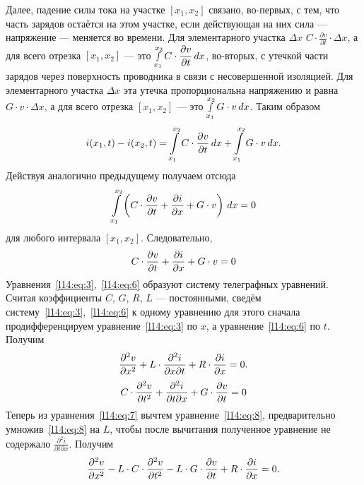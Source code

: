 \documentclass[12pt,a4paper,openany,fleqn]{book}
\newcommand{\pder}[2]{\ensuremath{\frac{\partial#1}{\partial#2}}}
\newcommand{\pdder}[2]{\ensuremath{\frac{\partial^2#1}{\partial#2^2}}}
\theoremstyle{definition}
\begin{document}
	Далее, падение силы тока на участке $[x_1,x_2]$ связано, во-первых, с тем, что часть зарядов остаётся на этом участке, если действующая на них сила --- напряжение --- меняется во времени. Для элементарного участка $\Delta x$ $\displaystyle C\cdot\pder{v}{t}\cdot\Delta x$, а для всего отрезка $[x_1,x_2]$ --- это $\displaystyle\smallint\limits_{x_1}^{x_2}C\cdot\pder{v}{t}\,dx$,	во-вторых, с утечкой части зарядов через поверхность проводника в связи с несовершенной изоляцией. Для элементарного участка $\Delta x$ эта утечка пропорциональна напряжению и равна $G\cdot v\cdot\Delta x$, а для всего отрезка $[x_1,x_2]$ --- это $\displaystyle\smallint\limits_{x_1}^{x_2}G\cdot v\,dx$.
	Таким образом 
	\begin{equation}\label{l14:eq:4}
		\hfill i(x_1,t)-i(x_2,t)=\int\limits_{x_1}^{x_2}C\cdot\pder{v}{t}\,dx+\int\limits_{x_1}^{x_2}G\cdot v\,dx.\hfill
	\end{equation} 
	Действуя аналогично предыдущему получаем отсюда
	\begin{equation}\label{l14:eq:5}
		\hfill \int\limits_{x_1}^{x_2}\left(C\cdot\pder{v}{t}+\pder{i}{x}+G\cdot v\right)\,dx=0\hfill
	\end{equation} 
	для любого интервала $[x_1,x_2]$. Следовательно,
	\begin{equation}\label{l14:eq:6}
		\hfill C\cdot\pder{v}{t}+\pder{i}{x}+G\cdot v=0\hfill
	\end{equation}  
	Уравнения~\eqref{l14:eq:3},~\eqref{l14:eq:6} образуют систему телеграфных уравнений. Считая коэффициенты $C$, $G$, $R$, $L$ --- постоянными, сведём систему~\eqref{l14:eq:3},~\eqref{l14:eq:6} к одному уравнению для этого сначала продифференцируем уравнение~\eqref{l14:eq:3} по $x$, а уравнение~\eqref{l14:eq:6} по $t$. Получим 
	\begin{equation}\label{l14:eq:7}
		\hfill \pdder{v}{x}+L\cdot\pder{^2i}{x\partial t}+R\cdot \pder{i}{x}=0.\hfill
	\end{equation}
	\begin{equation}\label{l14:eq:8}
		\hfill C\cdot\pdder{v}{t}+\pder{^2i}{t\partial x}+G\cdot \pder{v}{t}=0\hfill
	\end{equation} 
	Теперь из уравнения~\eqref{l14:eq:7} вычтем уравнение~\eqref{l14:eq:8}, предварительно умножив~\eqref{l14:eq:8} на $L$, чтобы после вычитания полученное уравнение не содержало $\displaystyle\pder{^2i}{t\partial x}$. Получим
	\begin{equation}\label{l14:eq:9}
		\hfill \pdder{v}{x}-L\cdot C\cdot\pdder{v}{t}-L\cdot G\cdot \pder{v}{t}+R\cdot \pder{i}{x}=0.\hfill
	\end{equation} 
\end{document}

